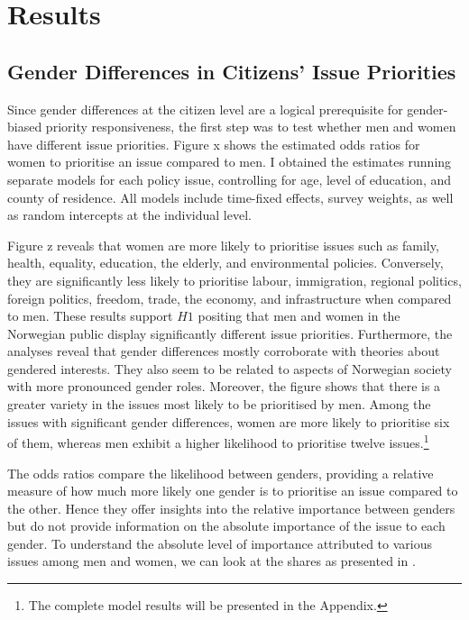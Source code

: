 
\section*{Results}
\subsection*{Gender Differences in Citizens' Issue Priorities}
Since gender differences at the citizen level are a logical prerequisite for gender-biased priority responsiveness, the first step was to test whether men and women have different issue priorities. Figure x  shows the estimated odds ratios for women to prioritise an issue compared to men. I obtained the estimates running separate models for each policy issue, controlling for age, level of education, and county of residence. All models include time-fixed effects, survey weights, as well as random intercepts at the individual level.

Figure z  reveals that women are more likely to prioritise issues such as family, health, equality, education, the elderly, and environmental policies. Conversely, they are significantly less likely to prioritise labour, immigration, regional politics, foreign politics, freedom, trade, the economy, and infrastructure when compared to men. These results support $H1$ positing that men and women in the Norwegian public display significantly different issue priorities. Furthermore, the analyses reveal that gender differences mostly corroborate with theories about gendered interests. They also seem to be related to aspects of Norwegian society with more pronounced gender roles. Moreover, the figure shows that there is a greater variety in the issues most likely to be prioritised by men. Among the issues with significant gender differences, women are more likely to prioritise six of them, whereas men exhibit a higher likelihood to prioritise twelve issues.\footnote{\color{red} The complete model results will be presented in the Appendix.}

The odds ratios compare the likelihood between genders, providing a relative measure of how much more likely one gender is to prioritise an issue compared to the other. Hence they offer insights into the relative importance between genders but do not provide information on the absolute importance of the issue to each gender. To understand the absolute level of importance attributed to various issues among men and women, we can look at the shares as presented in . 


